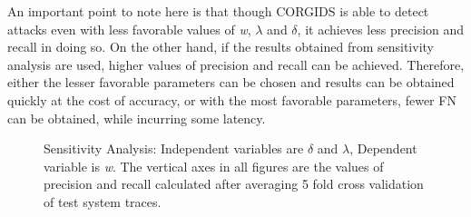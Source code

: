 An important point to note here is that though \ac{CORGIDS} is able to detect attacks even with less favorable values of \textit{w}, $\lambda$ and $\delta$, it achieves less precision and recall in doing so. On the other hand, if the results obtained from sensitivity analysis are used, higher values of precision and recall can be achieved. Therefore, either the lesser favorable parameters can be chosen and results can be obtained quickly at the cost of accuracy, or with the most favorable parameters, fewer \ac{FN} can be obtained, while incurring some latency.


\begin{figure}%
    \centering
    \qquad
    \caption{Sensitivity Analysis: Independent variables are $\delta$ and $\lambda$, Dependent variable is \textit{w}. The vertical axes in all figures are the values of precision and recall calculated after averaging 5 fold cross validation of test system traces.}%
    \label{fig:sensitivityAnalysis}%
\end{figure}

